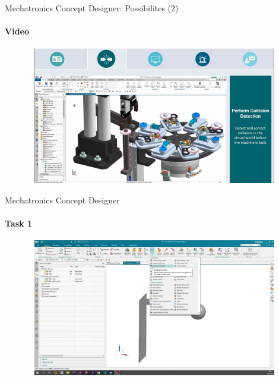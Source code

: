 \documentclass[aspectratio=169]{beamer}
\begin{document}
\begin{frame}[t]{Mechatronics Concept Designer: Possibilites (2)}
    \framesubtitle{Video}
    \vspace{-0.6cm}
    \begin{figure}[H]
        \href{https://youtu.be/ZvrE2IfrfgI}{
            \centering\includegraphics[height=6cm,width=1\textwidth,keepaspectratio]{mcd_video2_preview.jpg}}
        \label{fig:mcd_video2_preview.jpg}
    \end{figure}
\end{frame}

\begin{frame}[t]{Mechatronics Concept Designer}
    \framesubtitle{Task 1}
    \vspace{-0.6cm}
    \begin{figure}[H]
        \href{https://disk.yandex.ru/i/F-FYIX3xmzNACg}{
            \centering\includegraphics[height=6cm,width=1\textwidth,keepaspectratio]{mcd_video_preview.png}}
        \label{fig:mcd_video_preview.png}
    \end{figure}
\end{frame}
\end{document}
